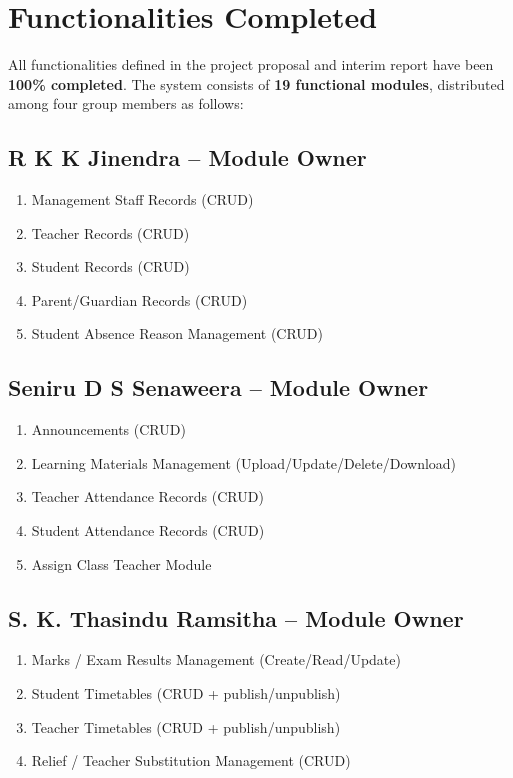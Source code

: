 \documentclass[12pt, a4paper]{report}
\begin{document}
\section{Functionalities Completed}

All functionalities defined in the project proposal and interim report have been \textbf{100\% completed}. The system consists of \textbf{19 functional modules}, distributed among four group members as follows:

\subsection{R K K Jinendra -- Module Owner}
\begin{enumerate}
    \item Management Staff Records (CRUD)
    \item Teacher Records (CRUD)
    \item Student Records (CRUD)
    \item Parent/Guardian Records (CRUD)
    \item Student Absence Reason Management (CRUD)
\end{enumerate}

\subsection{Seniru D S Senaweera -- Module Owner}
\begin{enumerate}
    \item Announcements (CRUD)
    \item Learning Materials Management (Upload/Update/Delete/Download)
    \item Teacher Attendance Records (CRUD)
    \item Student Attendance Records (CRUD)
    \item Assign Class Teacher Module
\end{enumerate}

\subsection{S. K. Thasindu Ramsitha -- Module Owner}
\begin{enumerate}
    \item Marks / Exam Results Management (Create/Read/Update)
    \item Student Timetables (CRUD + publish/unpublish)
    \item Teacher Timetables (CRUD + publish/unpublish)
    \item Relief / Teacher Substitution Management (CRUD)
\end{enumerate}
\end{document}
